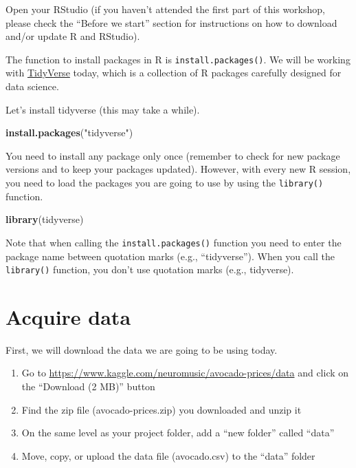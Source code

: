 \documentclass[]{book}
\newenvironment{Shaded}{\begin{snugshade}}{\end{snugshade}}
\newcommand{\KeywordTok}[1]{\textcolor[rgb]{0.13,0.29,0.53}{\textbf{#1}}}
\newcommand{\NormalTok}[1]{#1}
\newcommand{\StringTok}[1]{\textcolor[rgb]{0.31,0.60,0.02}{#1}}
\providecommand{\tightlist}{%
  \setlength{\itemsep}{0pt}\setlength{\parskip}{0pt}}
\begin{document}
Open your RStudio (if you haven't attended the first part of this workshop, please check the ``Before we start'' section for instructions on how to download and/or update R and RStudio).

The function to install packages in R is \texttt{install.packages()}. We will be working with \href{https://www.tidyverse.org/}{TidyVerse} today, which is a collection of R packages carefully designed for data science.

Let's install tidyverse (this may take a while).

\begin{Shaded}
\begin{Highlighting}[]
\KeywordTok{install.packages}\NormalTok{(}\StringTok{"tidyverse"}\NormalTok{)}
\end{Highlighting}
\end{Shaded}

You need to install any package only once (remember to check for new package versions and to keep your packages updated). However, with every new R session, you need to load the packages you are going to use by using the \texttt{library()} function.

\begin{Shaded}
\begin{Highlighting}[]
\KeywordTok{library}\NormalTok{(tidyverse)}
\end{Highlighting}
\end{Shaded}

\leavevmode\hypertarget{explanation}{}%
Note that when calling the \texttt{install.packages()} function you need to enter the package name between quotation marks (e.g., ``tidyverse''). When you call the \texttt{library()} function, you don't use quotation marks (e.g., tidyverse).

\hypertarget{acquire-data}{%
\section{Acquire data}\label{acquire-data}}

First, we will download the data we are going to be using today.

\begin{enumerate}
\def\labelenumi{\arabic{enumi}.}
\tightlist
\item
  Go to \url{https://www.kaggle.com/neuromusic/avocado-prices/data} and click on the ``Download (2 MB)'' button
\item
  Find the zip file (avocado-prices.zip) you downloaded and unzip it
\item
  On the same level as your project folder, add a ``new folder'' called ``data''
\item
  Move, copy, or upload the data file (avocado.csv) to the ``data'' folder
\end{enumerate}
\end{document}
